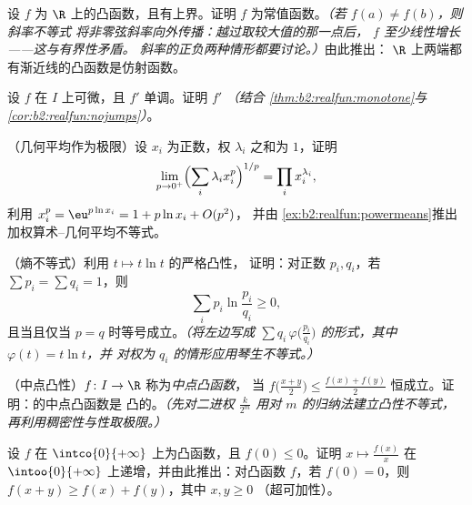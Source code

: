 \begin{exercise}[$\star\star$]\label{exo:b2:realfun:4}
设 $f$ 为 $\R$ 上的凸函数，且有上界。证明 $f$
为常值函数。\emph{（若 $f(a) \neq f(b)$，则斜率不等式
将非零弦斜率向外传播：越过取较大值的那一点后，
$f$ 至少线性增长——这与有界性矛盾。
斜率的正负两种情形都要讨论。）}由此推出：
$\R$ 上两端都有渐近线的凸函数是仿射函数。
\end{exercise}

\begin{exercise}[$\star\star$]\label{exo:b2:realfun:5}
设 $f$ 在 $I$ 上可微，且 $f'$ 单调。证明
$f'$  \emph{（结合
\cref{thm:b2:realfun:monotone}与
\cref{cor:b2:realfun:nojumps}）}。
\end{exercise}

\begin{exercise}[$\star\star$]\label{exo:b2:realfun:6}
（几何平均作为极限）设 $x_i$ 为正数，权
$\lambda_i$ 之和为 $1$，证明
\[
\lim_{p \to 0^+} \Bigl(\sum_i \lambda_i x_i^p\Bigr)^{1/p}
= \prod_i x_i^{\lambda_i} ,
\]
利用 $x_i^p = \eu^{p\ln x_i} = 1 + p\ln x_i + O(p^2)$，
并由
\cref{ex:b2:realfun:powermeans}推出加权算术–几何平均不等式。
\end{exercise}

\begin{exercise}[$\star\star$]\label{exo:b2:realfun:7}
（熵不等式）利用 $t \mapsto t\ln t$ 的严格凸性，
证明：对正数 $p_i, q_i$，若 $\sum p_i = \sum q_i = 1$，则
\[
\sum_i p_i \ln\frac{p_i}{q_i} \geq 0 ,
\]
且当且仅当 $p = q$ 时等号成立。\emph{（将左边写成 $\sum q_i\,
\varphi\bigl(\frac{p_i}{q_i}\bigr)$ 的形式，其中 $\varphi(t) = t\ln t$，并
对权为 $q_i$ 的情形应用琴生不等式。）}
\end{exercise}

\begin{exercise}[$\star\star\star$]\label{exo:b2:realfun:8}
（中点凸性）$f \colon I \to \R$ 称为\emph{中点凸函数}，
当 $f\bigl(\frac{x+y}{2}\bigr) \leq \frac{f(x) + f(y)}{2}$
恒成立。证明：\emph{}的中点凸函数是
凸的。\emph{（先对二进权
$\frac{k}{2^m}$ 用对 $m$ 的归纳法建立凸性不等式，
再利用稠密性与性取极限。）}
\end{exercise}

\begin{exercise}[$\star\star\star$]\label{exo:b2:realfun:9}
设 $f$ 在 $\intco{0}{+\infty}$ 上为凸函数，且 $f(0) \leq 0$。证明
$x \mapsto \frac{f(x)}{x}$ 在
$\intoo{0}{+\infty}$ 上递增，并由此推出：对凸函数 $f$，若 $f(0) =
0$，则 $f(x + y) \geq f(x) + f(y)$，其中 $x, y \geq 0$
（超可加性）。
\end{exercise}

